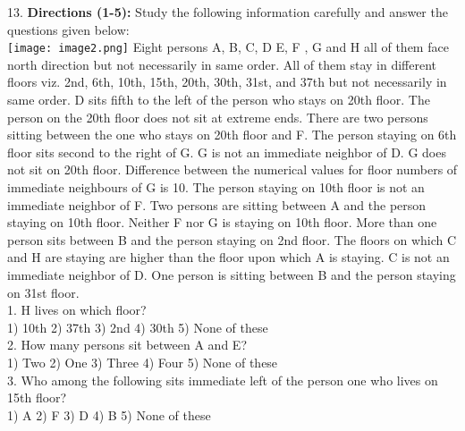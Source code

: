 \documentclass[
]{article}
\begin{document}
13. \textbf{Directions (1-5):} Study the following information carefully and answer the questions given
below:\\
\texttt{[image: image2.png]}
Eight persons A, B, C, D E, F , G and H all of them face north direction but not necessarily in
same order. All of them stay in different floors viz. 2nd, 6th, 10th, 15th, 20th, 30th, 31st, and
37th but not necessarily in same order. D sits fifth to the left of the person who stays on 20th
floor. The person on the 20th floor does not sit at extreme ends. There are two persons
sitting between the one who stays on 20th floor and F. The person staying on 6th floor sits
second to the right of G. G is not an immediate neighbor of D. G does not sit on 20th floor.
Difference between the numerical values for floor numbers of immediate neighbours of G is
10. The person staying on 10th floor is not an immediate neighbor of F. Two persons are
sitting between A and the person staying on 10th floor. Neither F nor G is staying on 10th
floor. More than one person sits between B and the person staying on 2nd floor. The floors
on which C and H are staying are higher than the floor upon which A is staying. C is not an
immediate neighbor of D. One person is sitting between B and the person staying on 31st
floor.\\

1. H lives on which floor?\\
1) 10th \hspace{2mm}2) 37th \hspace{2mm}3) 2nd \hspace{2mm}4) 30th \hspace{2mm}5) None of these\\

2. How many persons sit between A and E?\\
1) Two \hspace{2mm}2) One \hspace{2mm}3) Three \hspace{2mm}4) Four \hspace{2mm}5) None of these\\

3. Who among the following sits immediate left of the person one who lives on 15th floor?\\
1) A \hspace{2mm}2) F \hspace{2mm}3) D \hspace{2mm}4) B \hspace{2mm}5) None of these\\
\end{document}
